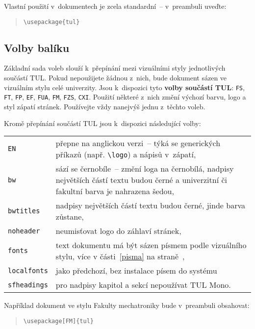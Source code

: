 \documentclass[a4paper,12pt,twoside,FP]{article}
\makeatletter
\newcommand{\cmdfont}[1]{\texttt{\color{\tulcolor}#1}}
\newcommand{\cmdnoindex}[1]{\cmdfont{\textbackslash #1}}
\newcommand{\cmd}[1]{\cmdnoindex{#1}\index{#1@\textbackslash #1}}
\makeatother
\begin{document}
Vlastní použití v~dokumentech je zcela standardní~-- v~preambuli uveďte:

\begin{quote}
\cmdnoindex{usepackage\{tul\}}
\end{quote}


\subsection*{Volby balíku}

Základní sada voleb slouží k~přepínání mezi vizuálními styly jednotlivých
součástí TUL. Pokud nepoužijete žádnou z~nich, bude dokument sázen ve
vizuálním stylu celé univerzity. Jsou k~dispozici tyto \textbf{volby součástí
TUL}: \cmdfont{FS}, \cmdfont{FT}, \cmdfont{FP}, \cmdfont{EF}, \cmdfont{FUA},
\cmdfont{FM}, \cmdfont{FZS}, \cmdfont{CXI}. Použití některé z~nich změní
výchozí barvu, logo a styl zápatí stránek. Používejte vždy nanejvýš jednu
z~těchto voleb.

Kromě přepínání součástí TUL jsou k~dispozici následující volby:

\medskip

\begin{tabularx}{\textwidth}{@{}lX}
\cmdfont{EN} & přepne na anglickou verzi~-- týká se generických příkazů
(např. \cmd{logo}) a nápisů v~zápatí,\\
\cmdfont{bw} & sází se černobíle~-- změní loga na černobílá, nadpisy největších
částí textu budou černé a univerzitní či fakultní barva je nahrazena šedou,\\
\cmdfont{bwtitles} & nadpisy největších částí textu budou černé, jinde barva
zůstane,\\
\cmdfont{noheader} & neumisťovat logo do záhlaví stránek,\\
\cmdfont{fonts} & text dokumentu má být sázen písmem podle vizuálního stylu,
více v části~\ref{pisma} na straně~\pageref{pisma},\\
\cmdfont{localfonts} & jako předchozí, bez instalace písem do systému\\
\cmdfont{sfheadings} & pro nadpisy kapitol a sekcí nepoužívat TUL Mono.\\
\end{tabularx}

\medskip

Například dokument ve stylu Fakulty mechatroniky bude v~preambuli obsahovat:

\begin{quote}
\cmdnoindex{usepackage[FM]\{tul\}}
\end{quote}
\end{document}
